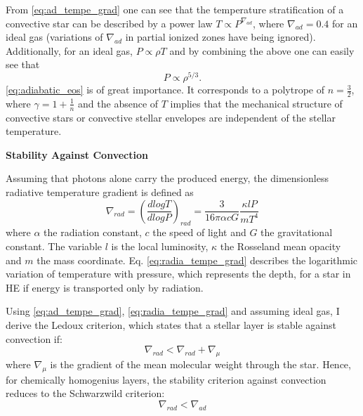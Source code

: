 From \cref{eq:ad_tempe_grad} one can see that the temperature stratification of a convective star can be described by a power law $T \propto P^{\nabla_{ad}}$, where $\nabla_{ad} = 0.4$ for an ideal gas \citep{pols2011stellar} (variations of $\nabla_{ad}$ in partial ionized zones have being ignored). Additionally, for an ideal gas, $P \propto \rho T$ and by combining the above one can easily see that
\begin{equation}\label{eq:adiabatic_eos}
    P \propto \rho^{5/3}.
\end{equation}
\cref{eq:adiabatic_eos} is of great importance. It corresponds to a polytrope of $n = \frac{3}{2}$, where $\gamma = 1+ \frac{1}{n}$ and the absence of $T$ implies that the mechanical structure of convective stars or convective stellar envelopes are independent of the stellar temperature. 

{\bf Stability Against Convection}


Assuming that photons alone carry the produced energy, the dimensionless radiative temperature gradient is defined as
\begin{equation}\label{eq:radia_tempe_grad}
    \nabla_{rad} = \left ( \frac{d logT}{d logP} \right)_{rad} = \frac{3}{16 \pi \alpha c G} \frac{\kappa l P}{m T^4}
\end{equation}
where $\alpha$ the radiation constant, $c$ the speed of light and $G$ the gravitational constant. The variable $l$ is the local luminosity, $\kappa$ the Rosseland mean opacity and $m$ the mass coordinate. Eq. \eqref{eq:radia_tempe_grad} describes the logarithmic variation of temperature with pressure, which represents the depth, for a star in HE if energy is transported only by radiation.

Using \eqref{eq:ad_tempe_grad}, \eqref{eq:radia_tempe_grad}  and assuming ideal gas, I derive the  Ledoux criterion,  which states that a stellar layer is stable against convection if:
\begin{equation}\label{eq:Ledoux_criterion}
    \nabla_{rad} < \nabla_{rad} +  \nabla_{\mu}
\end{equation}
where $\nabla_{\mu}$ is the gradient of the mean molecular weight through the star. Hence, for chemically homogenius layers, the stability criterion against convection reduces to the Schwarzwild criterion:
\begin{equation}\label{eq:Schwarzwild_criterion}
    \nabla_{rad} < \nabla_{ad}
\end{equation}

